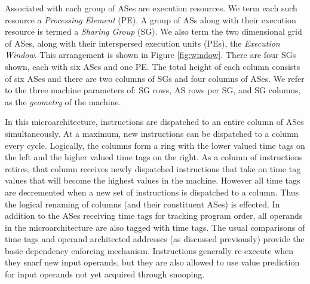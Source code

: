 \documentclass[10pt,twocolumn]{article}
\begin{document}
Associated with each group of ASes are execution resources.
We term each such resource
a \textit{Processing Element} (PE).  
A group of ASs along with their execution resource
is termed a \textit{Sharing Group} (SG).
We also term the two dimensional
grid of ASes, along with their interspersed execution units (PEs),
the {\em Execution Window}.
This arrangement is shown in Figure \ref{fig:window}.  
There are four SGs shown, each with six ASes and one PE.
The total height of each column consists of six ASes and there
are two columns of SGs and four columns of ASes.
We refer to the three machine parameters of: SG rows, AS rows per SG,
and SG columns, as the \textit{geometry} of the machine.
%
\begin{figure*}
\centering
{}
\caption{{\em Execution Window.} Shown are four sharing groups
each with six active stations and one shared processing element.
There are six rows of ASes in each column of the entire arrangement.}
\label{fig:window}
\end{figure*}
%
In this microarchitecture, instructions are dispatched to an entire
column of ASes simultaneously.
At a maximum, new instructions can be dispatched to a column every
cycle.  
Logically, the columns form a ring with the lower valued
time tags on the left and the higher valued time tags on
the right.  
As a column of instructions retires, that column 
receives
newly dispatched instructions that take on time tag values
that will become the highest values in the machine.
However all time tags are decremented
when a new set of instructions is dispatched to a column.
Thus the logical renaming of columns (and their constituent ASes)
is effected.
In addition to the ASes receiving time tags for tracking program
order, all operands in the microarchitecture are also tagged
with time tags.  The usual comparisons 
of time tags and operand architected addresses 
(as discussed previously) provide
the basic dependency enforcing mechanism.
Instructions generally re-execute when they snarf new
input operands, but they are also allowed to use value prediction
for input operands not yet acquired through snooping.
\end{document}

